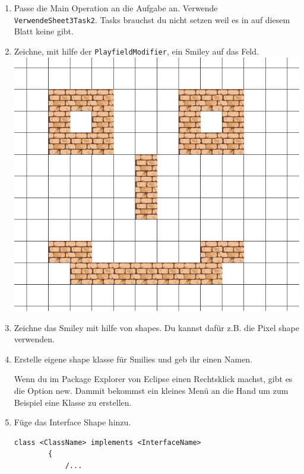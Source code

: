 \begin{enumerate}
    \item Passe die Main Operation an die Aufgabe an. Verwende \lstinline{VerwendeSheet3Task2}. Tasks brauchst du nicht setzen weil es in auf diesem Blatt keine gibt.
    \item Zeichne, mit hilfe der \lstinline{PlayfieldModifier}, ein Smiley auf das Feld.
    \\ \includegraphics[width=\linewidth]{./figures/smily.png}
    \item Zeichne das Smiley mit hilfe von shapes. Du kannst dafür z.B. die Pixel shape verwenden.
    \item Erstelle eigene shape klasse für Smilies und geb ihr einen Namen.
    \begin{Infobox}
        Wenn du im Package Explorer von Eclipse einen Rechtsklick machst, gibt es die Option new.
        Dammit bekommst ein kleines Menü an die Hand um zum Beispiel eine Klasse zu erstellen.
    \end{Infobox}
    \item Füge das Interface Shape hinzu.
    \begin{lstlisting}[title=Interface Syntax,frame=ltr]
        class <ClassName> implements <InterfaceName>
        {
            /...
    \end{lstlisting}
    \begin{Infobox}[Interface]

\end{Infobox}
\end{enumerate}

